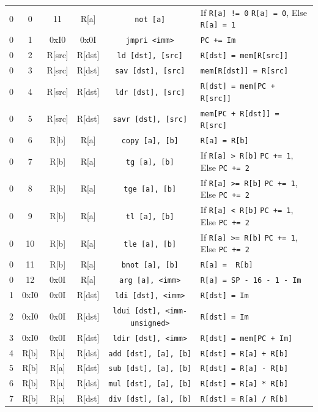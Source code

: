 \documentclass{article}
\begin{document}
\begin{table}[h!]
\begin{footnotesize}
\begin{tabular}{cccc|c|l}
 			0 & 0 & 11 & R[a] & \texttt{not [a]} & If \texttt{R[a] != 0} \texttt{R[a] = 0}, Else \texttt{R[a] = 1} \\
			0 & 1 & 0xI0 & 0x0I & \texttt{jmpri <imm>} & \texttt{PC += Im} \\
			0 & 2 & R[src] & R[dst] & \texttt{ld [dst], [src]} & \texttt{R[dst] = mem[R[src]]} \\
			0 & 3 & R[src] & R[dst] & \texttt{sav [dst], [src]} & \texttt{mem[R[dst]] = R[src]} \\
			0 & 4 & R[src] & R[dst] & \texttt{ldr [dst], [src]} & \texttt{R[dst] = mem[PC + R[src]]} \\
			0 & 5 & R[src] & R[dst] & \texttt{savr [dst], [src]} & \texttt{mem[PC + R[dst]] = R[src]} \\
			0 & 6 & R[b] & R[a] & \texttt{copy [a], [b]} & \texttt{R[a] = R[b]} \\
			0 & 7 & R[b] & R[a] & \texttt{tg [a], [b]} & If \texttt{R[a] > R[b]} \texttt{PC += 1}, Else \texttt{PC += 2} \\
			0 & 8 & R[b] & R[a] & \texttt{tge [a], [b]} & If \texttt{R[a] >= R[b]} \texttt{PC += 1}, Else \texttt{PC += 2} \\
			0 & 9 & R[b] & R[a] & \texttt{tl [a], [b]} & If \texttt{R[a] < R[b]} \texttt{PC += 1}, Else \texttt{PC += 2} \\
			0 & 10 & R[b] & R[a] & \texttt{tle [a], [b]} & If \texttt{R[a] >= R[b]} \texttt{PC += 1}, Else \texttt{PC += 2}\\
			0 & 11 & R[b] & R[a] & \texttt{bnot [a], [b]} & \texttt{R[a] = ~R[b]} \\
			0 & 12 & 0x0I & R[a] & \texttt{arg [a], <imm>} & \texttt{R[a] = SP - 16 - 1 - Im} \\
			1 & 0xI0 & 0x0I & R[dst] & \texttt{ldi [dst], <imm>} & \texttt{R[dst] = Im} \\
			2 & 0xI0 & 0x0I & R[dst] & \texttt{ldui [dst], <imm-unsigned>} & \texttt{R[dst] = Im} \\
			3 & 0xI0 & 0x0I & R[dst] & \texttt{ldir [dst], <imm>} & \texttt{R[dst] = mem[PC + Im]} \\
			4 & R[b] & R[a] & R[dst] & \texttt{add [dst], [a], [b]} & \texttt{R[dst] = R[a] + R[b]} \\
			5 & R[b] & R[a] & R[dst] & \texttt{sub [dst], [a], [b]} & \texttt{R[dst] = R[a] - R[b]} \\
			6 & R[b] & R[a] & R[dst] & \texttt{mul [dst], [a], [b]} & \texttt{R[dst] = R[a] * R[b]} \\
			7 & R[b] & R[a] & R[dst] & \texttt{div [dst], [a], [b]} & \texttt{R[dst] = R[a] / R[b]} \\

\end{tabular}
\end{footnotesize}
\end{table}
\end{document}
